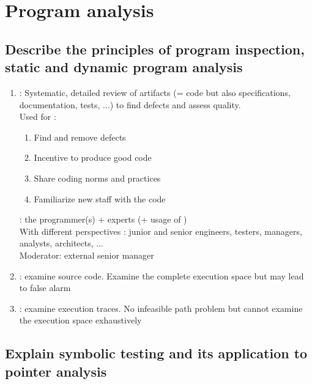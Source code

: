\chapter{Program analysis}

\section{Describe the principles of program inspection, static and dynamic program analysis}

\begin{enumerate}
    \item {} : Systematic, detailed review of artifacts (= code but also specifications, documentation, tests, ...) to find defects and assess quality.\\ 
    Used for :
    \begin{enumerate}
        \item Find and remove defects
        \item Incentive to produce good code
        \item Share coding norms and practices
        \item Familiarize new staff with the code
    \end{enumerate}
    : the programmer(s) + experts (+ usage of )\\
    With different perspectives : junior and senior engineers, testers, managers, analysts, architects, ...\\
    Moderator: external senior manager
    \item {} : examine source code. Examine the complete execution space but may lead to false alarm
    \item {} : examine execution traces. No infeasible path problem but cannot examine the execution space exhaustively
\end{enumerate}

\section{Explain symbolic testing and its application to pointer analysis}

